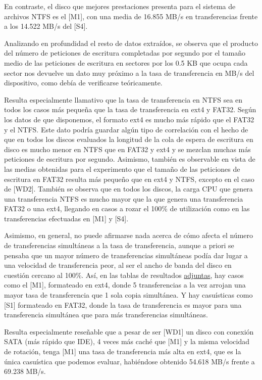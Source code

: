 \documentclass[a4paper,10pt]{article}
\begin{document}
 En contraste, el disco que mejores prestaciones presenta para el sistema de archivos NTFS es el [M1], con una
 media de 16.855 MB/s en transferencias frente a los 14.522 MB/s del [S4].
 
 Analizando en profundidad el resto de datos extraídos, se observa que el producto del número de peticiones de escritura completadas
 por segundo por el tamaño medio de las peticiones de escritura en sectores por los 0.5 KB que ocupa cada sector
 nos devuelve un dato muy próximo a la tasa de transferencia en MB/s del dispositivo, como debía de verificarse teóricamente.
 
 Resulta especialmente llamativo que la tasa de transferencia en NTFS sea en todos los casos más pequeña que la tasa
 de transferencia en ext4 y FAT32. Según los datos de que disponemos, el formato ext4 es mucho más rápido que el FAT32 y el NTFS. Este
 dato podría guardar algún tipo de correlación con el hecho de que en todos los discos evaluados la longitud de la cola
 de espera de escritura en disco es mucho menor en NTFS que en FAT32 y ext4 y se mezclan muchas más peticiones de escritura por segundo.
 Asimismo, también es observable en vista de las medias obtenidas para el experimento que el tamaño de las peticiones
 de escritura en FAT32 resulta más pequeño que en ext4 y NTFS, excepto en el caso de [WD2]. También se observa que en todos
 los discos, la carga CPU que genera una transferencia NTFS es mucho mayor que la que genera una transferencia FAT32 o una ext4,
 llegando en casos a rozar el 100\% de utilización como en las transferencias efectuadas en [M1] y [S4].
 
 Asimismo, en general, no puede afirmarse nada acerca de cómo afecta el número de transferencias simultáneas a 
 la tasa de transferencia, aunque a priori se pensaba que un mayor número de transferencias simultáneas podía dar lugar a
 una velocidad de transferencia peor, al ser el ancho de banda del disco en cuestión cercano al 100\%. Así, en las
 tablas de resultados \hyperlink{tablas}{adjuntas}, hay casos como el [M1], formateado en ext4, donde 5 transferencias
 a la vez arrojan una mayor tasa de transferencia que 1 sola copia simultánea. Y hay casuísticas como [S1] formateado en
 FAT32, donde la tasa de transferencia es mayor para una transferencia simultánea que para más transferencias simultáneas.
 
 Resulta especialmente reseñable que a pesar de ser [WD1] un disco con conexión SATA (más rápido que IDE), 4 veces más caché
 que [M1] y la misma velocidad de rotación, tenga [M1] una tasa de transferencia más alta en ext4, que es la única
 casuística que podemos evaluar, habiéndose obtenido 54.618 MB/s frente a 69.238 MB/s.
 
\end{document}
